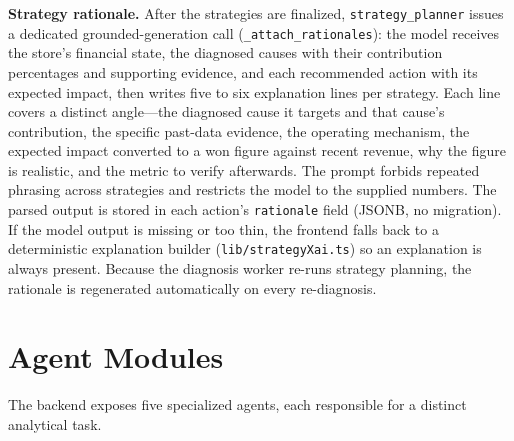 \documentclass[11pt, a4paper]{article}
\begin{document}
\textbf{Strategy rationale.}
After the strategies are finalized, \texttt{strategy\_planner} issues a
dedicated grounded-generation call (\texttt{\_attach\_rationales}): the
model receives the store's financial state, the diagnosed causes with
their contribution percentages and supporting evidence, and each
recommended action with its expected impact, then writes five to six
explanation lines per strategy. Each line covers a distinct angle---the
diagnosed cause it targets and that cause's contribution, the specific
past-data evidence, the operating mechanism, the expected impact
converted to a won figure against recent revenue, why the figure is
realistic, and the metric to verify afterwards. The prompt forbids
repeated phrasing across strategies and restricts the model to the
supplied numbers. The parsed output is stored in each action's
\texttt{rationale} field (JSONB, no migration). If the model output is
missing or too thin, the frontend falls back to a deterministic
explanation builder (\texttt{lib/strategyXai.ts}) so an explanation is
always present. Because the diagnosis worker re-runs strategy planning,
the rationale is regenerated automatically on every re-diagnosis.


\section{Agent Modules}

The backend exposes five specialized agents, each responsible
for a distinct analytical task.
\end{document}

